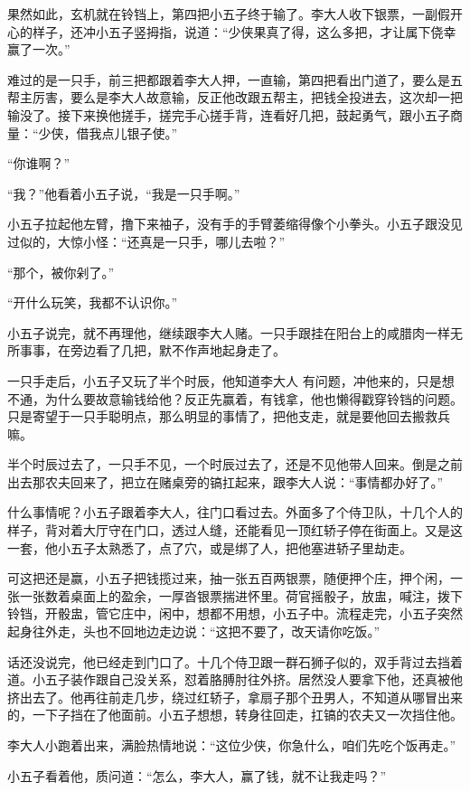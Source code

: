 果然如此，玄机就在铃铛上，第四把小五子终于输了。李大人收下银票，一副假开心的样子，还冲小五子竖拇指，说道：“少侠果真了得，这么多把，才让属下侥幸赢了一次。”

难过的是一只手，前三把都跟着李大人押，一直输，第四把看出门道了，要么是五帮主厉害，要么是李大人故意输，反正他改跟五帮主，把钱全投进去，这次却一把输没了。接下来换他搓手，搓完手心搓手背，连看好几把，鼓起勇气，跟小五子商量：“少侠，借我点儿银子使。”

“你谁啊？”

“我？”他看着小五子说，“我是一只手啊。”

小五子拉起他左臂，撸下来袖子，没有手的手臂萎缩得像个小拳头。小五子跟没见过似的，大惊小怪：“还真是一只手，哪儿去啦？”

“那个，被你剁了。”

“开什么玩笑，我都不认识你。”

小五子说完，就不再理他，继续跟李大人赌。一只手跟挂在阳台上的咸腊肉一样无所事事，在旁边看了几把，默不作声地起身走了。

一只手走后，小五子又玩了半个时辰，他知道李大人
有问题，冲他来的，只是想不通，为什么要故意输钱给他？反正先赢着，有钱拿，他也懒得戳穿铃铛的问题。只是寄望于一只手聪明点，那么明显的事情了，把他支走，就是要他回去搬救兵嘛。

半个时辰过去了，一只手不见，一个时辰过去了，还是不见他带人回来。倒是之前出去那农夫回来了，把立在赌桌旁的镐扛起来，跟李大人说：“事情都办好了。”

什么事情呢？小五子跟着李大人，往门口看过去。外面多了个侍卫队，十几个人的样子，背对着大厅守在门口，透过人缝，还能看见一顶红轿子停在街面上。又是这一套，他小五子太熟悉了，点了穴，或是绑了人，把他塞进轿子里劫走。

可这把还是赢，小五子把钱揽过来，抽一张五百两银票，随便押个庄，押个闲，一张一张数着桌面上的盈余，一厚沓银票揣进怀里。荷官摇骰子，放盅，喊注，拨下铃铛，开骰盅，管它庄中，闲中，想都不用想，小五子中。流程走完，小五子突然起身往外走，头也不回地边走边说：“这把不要了，改天请你吃饭。”

话还没说完，他已经走到门口了。十几个侍卫跟一群石狮子似的，双手背过去挡着道。小五子装作跟自己没关系，怼着胳膊肘往外挤。居然没人要拿下他，还真被他挤出去了。他再往前走几步，绕过红轿子，拿扇子那个丑男人，不知道从哪冒出来的，一下子挡在了他面前。小五子想想，转身往回走，扛镐的农夫又一次挡住他。

李大人小跑着出来，满脸热情地说：“这位少侠，你急什么，咱们先吃个饭再走。”

小五子看着他，质问道：“怎么，李大人，赢了钱，就不让我走吗？”

